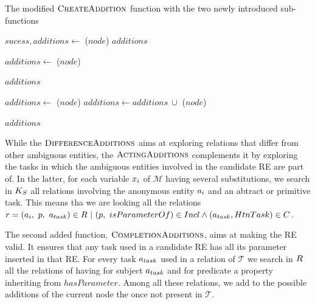 \begin{algorithm}[htb!]
\caption{\label{alg:chap6_additions} The modified $\textsc{CreateAddition}$ function with the two newly introduced sub-functions}

\begin{algorithmic}

        \State $sucess, additions\leftarrow$ \typingadditions($node$)
            \Return $additions$
        \EndIf
        
        \State $additions\leftarrow$ \completionadditions($node$) 
        
            \Return $additions$
        \EndIf
        
        \State $additions\leftarrow$ \actingadditions($node$) 
        \State $additions\leftarrow additions\ \cup$ \differenceadditions($node$) 
        
        \Return $additions$
    \EndFunction
    
\end{algorithmic}
\end{algorithm}

While the $\textsc{DifferenceAdditions}$ aims at exploring relations that differ from other ambiguous entities, the $\textsc{ActingAdditions}$ complements it by exploring the tasks in which the ambiguous entities involved in the candidate RE are part of. In the latter, for each variable $x_i$ of $\mathcal{M}$ having several substitutions, we search in $K_S$ all relations involving the anonymous entity $a_i$ and an abtract or primitive task. This means tha we are looking all the relations $r = (a_i,\ p,\ a_{task}) \in R\ |\ (p,\ isParameterOf) \in Incl \wedge (a_{task}, HtnTask) \in C$.

The second added function, $\textsc{CompletionAdditions}$, aims at making the RE valid. It ensures that any task used in a candidate RE has all its parameter inserted in that RE. For every task $a_{task}$ used in a relation of $\mathcal{T}$ we search in $R$ all the relations of having for subject $a_{task}$ and for predicate a property inheriting from $hasParameter$. Among all these relations, we add to the possible additions of the current node the once not present in $\mathcal{T}$.

